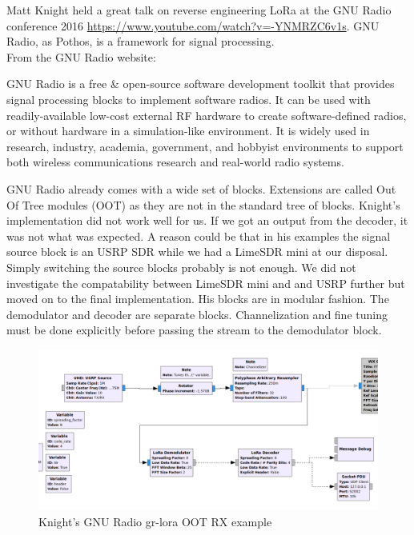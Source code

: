 Matt Knight held a great talk on reverse engineering LoRa at the GNU Radio conference 2016 \url{https://www.youtube.com/watch?v=-YNMRZC6v1s}.
GNU Radio, as Pothos, is a framework for signal processing.\\
From the GNU Radio website:
\begin{displayquote}
    GNU Radio is a free \& open-source software development toolkit that provides signal processing
    blocks to implement software radios. It can be used with readily-available low-cost external
    RF hardware to create software-defined radios, or without hardware in a simulation-like environment.
    It is widely used in research, industry, academia, government, and hobbyist environments to support both wireless
    communications research and real-world radio systems.~\cite{gnuradio}
\end{displayquote}

GNU Radio already comes with a wide set of blocks. Extensions are called Out Of Tree modules (OOT) as they are not in the 
standard tree of blocks. Knight's implementation did not work well for us. If we got an output from the decoder, it was not 
what was expected. A reason could be that in his examples the signal source block is an USRP SDR while we had a LimeSDR mini 
at our disposal. Simply switching the source blocks probably is not enough. We did not investigate the compatability between LimeSDR mini
and and USRP further but moved on to the final implementation.
His blocks are in modular fashion. The demodulator and decoder are separate blocks. Channelization and fine tuning must be done 
explicitly before passing the stream to the demodulator block.

\begin{figure}[h]
    \centering
    \includegraphics[width=1\textwidth]{figures/matt_gnu_example.png}
    \caption{Knight's GNU Radio gr-lora OOT RX example~\cite{knight_implementation}}
    \label{fig:knight_gnu}
\end{figure}

